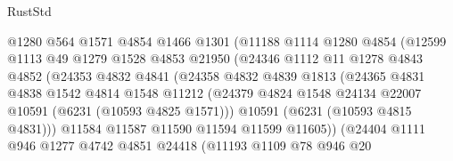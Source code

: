 \begin{lexlean}{RustStd}
\begin{coremodule}
{{                          @1280
                          @564
                          @1571
                          @4854
                          @1466
                          @1301
                          (@11188
                            @1114
                            @1280
                            @4854
                            (@12599
                              @1113
                              @49
                              @1279
                              @1528
                              @4853
                              @21950
                              (@24346
                                @1112
                                @11
                                @1278
                                @4843
                                @4852
                                (@24353
                                  @4832
                                  @4841
                                  (@24358
                                    @4832
                                    @4839
                                    @1813
                                    (@24365
                                      @4831
                                      @4838
                                      @1542
                                      @4814
                                      @1548
                                      @11212
                                      (@24379
                                        @4824
                                        @1548
                                        @24134
                                        @22007
                                        @10591
                                        (@6231 (@10593 @4825 @1571)))
                                      @10591
                                      (@6231 (@10593 @4815 @4831)))
                                    @11584
                                    @11587
                                    @11590
                                    @11594
                                    @11599
                                    @11605))
                                (@24404
                                  @1111
                                  @946
                                  @1277
                                  @4742
                                  @4851
                                  @24418
                                  (@11193
                                    @1109
                                    @78
                                    @946
                                    @20
}}
\end{coremodule}
\end{lexlean}
